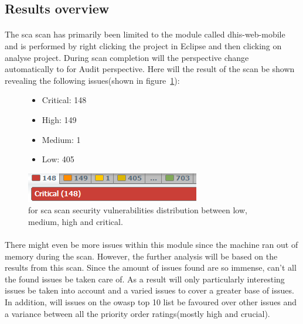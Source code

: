 \documentclass[11pt,english,a4paper]{report}
\begin{document}
\subsection{Results overview}
\paragraph{}
The \gls{sca} scan has primarily been limited to the module called dhis-web-mobile and is performed by right clicking the project in Eclipse and then clicking on analyse project.
During scan completion will the perspective change automatically to \gls{for} Audit perspective.
Here will the result of the scan be shown revealing the following issues(shown in figure~\ref{fig:issuesfoundmobilemodule}):

\begin{figure}[ht]
\RawFloats
    \begin{minipage}[b]{0.48\linewidth}
        \begin{itemize}
			\item Critical: 148
			\item High: 149
			\item Medium: 1
			\item Low: 405
		\end{itemize}
    \end{minipage}
    \hfill
    \begin{minipage}[b]{0.48\linewidth}
	    \centering
	    \includegraphics[scale=0.65]{images/foundissues.png}
	    \caption{\gls{for} \gls{sca} scan security vulnerabilities distribution between low, medium, high and critical. }
    	\label{fig:issuesfoundmobilemodule}
    \end{minipage}
\end{figure}

\paragraph{}
There might even be more issues within this module since the machine ran out of memory during the scan.
However, the further analysis will be based on the results from this scan.
Since the amount of issues found are so immense, can't all the found issues be taken care of. 
As a result will only particularly interesting issues be taken into account and a varied issues to cover a greater base of issues.
In addition, will issues on the \gls{owasp} top 10 list be favoured over other issues and a variance between all the priority order ratings(mostly high and crucial).
\end{document}
